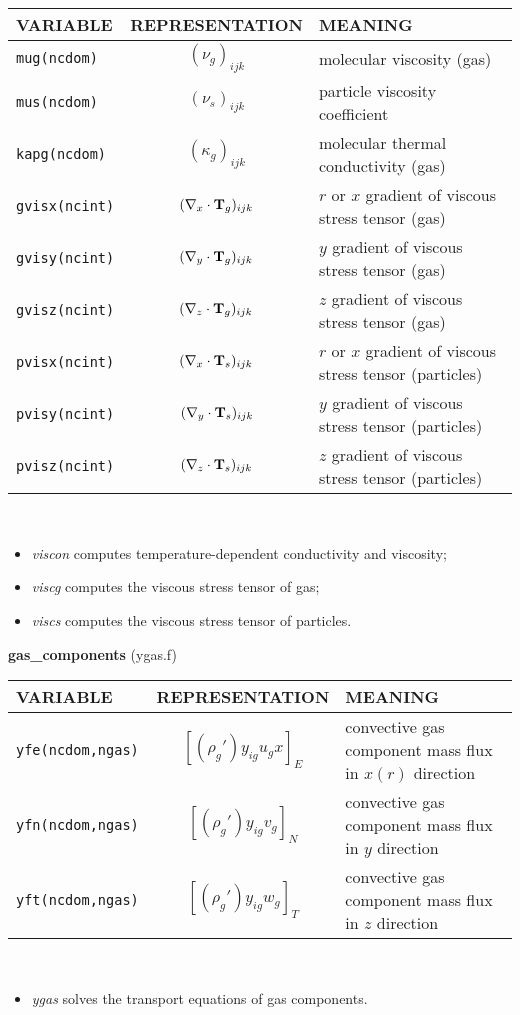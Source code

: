 \begin{tabular}{|p{6cm}|c|p{6cm}|}\hline
VARIABLE & REPRESENTATION & MEANING\\\hline
\tt mug(ncdom)& $(\nu_g)_{ijk}$ &   molecular viscosity (gas)\\\hline
\tt mus(ncdom)& $(\nu_s)_{ijk}$ &   particle viscosity coefficient \\\hline
\tt kapg(ncdom)& $(\kappa_g)_{ijk}$ &   molecular thermal conductivity (gas)\\\hline
\tt gvisx(ncint)& $(\nabla_x\cdot{\bf T}_g)_{ijk}$ & $r$ or $x$ gradient of viscous stress tensor (gas)\\\hline
\tt gvisy(ncint)& $(\nabla_y\cdot{\bf T}_g)_{ijk}$&  $y$ gradient of viscous stress tensor (gas)\\\hline
\tt gvisz(ncint)& $(\nabla_z\cdot{\bf T}_g)_{ijk}$&  $z$ gradient of viscous stress tensor (gas)\\\hline
\tt pvisx(ncint)& $(\nabla_x\cdot{\bf T}_s)_{ijk}$&  $r$ or $x$ gradient of viscous stress tensor (particles)\\\hline
\tt pvisy(ncint)& $(\nabla_y\cdot{\bf T}_s)_{ijk}$&  $y$ gradient of viscous stress tensor (particles)\\\hline
\tt pvisz(ncint)& $(\nabla_z\cdot{\bf T}_s)_{ijk}$&  $z$ gradient of viscous stress tensor (particles)\\\hline
\end{tabular}\\
\begin{itemize}
\item{\em viscon}  computes temperature-dependent conductivity and viscosity;
\item{\em viscg} computes the viscous stress tensor of gas;
\item{\em viscs} computes the viscous stress tensor of particles.
\end{itemize}
%
%
{\large{\bf gas\_components}} (ygas.f)\\[5mm]
\begin{tabular}{|p{6cm}|c|p{6cm}|}\hline
VARIABLE & REPRESENTATION & MEANING\\\hline
\tt yfe(ncdom,ngas) & $\left[ (\rho_g')y_{ig}u_gx \right]_{E} $ & convective gas component mass flux in $x(r)$ direction\\\hline
\tt yfn(ncdom,ngas) & $\left[ (\rho_g')y_{ig}v_g \right]_{N} $ & convective gas component mass flux in $y$ direction\\\hline
\tt yft(ncdom,ngas) & $\left[ (\rho_g')y_{ig}w_g \right]_{T} $ & convective gas component mass flux in $z$ direction\\\hline
\end{tabular}\\
\begin{itemize}
\item{\em ygas} solves the transport equations of gas components.
\end{itemize}
\clearpage
